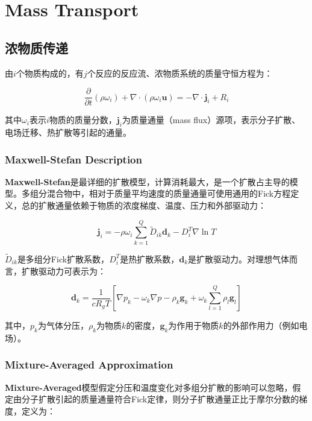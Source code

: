 \chapter{Mass Transport}

\section{浓物质传递}
由$i$个物质构成的，有$j$个反应的反应流、浓物质系统的质量守恒方程为：

\begin{equation}
    \frac{\partial}{\partial t}(\rho\omega_i) + \nabla\cdot(\rho\omega_i\bm{u}) = -\nabla\cdot\bm{j}_i + R_i
\end{equation}

其中$\omega_i$表示$i$物质的质量分数，$\bm{j}_i$为质量通量（mass flux）源项，表示分子扩散、电场迁移、热扩散等引起的通量。

\subsection{Maxwell-Stefan Description}
\textbf{Maxwell-Stefan}是最详细的扩散模型，计算消耗最大，是一个扩散占主导的模型。多组分混合物中，相对于质量平均速度的质量通量可使用通用的Fick方程定义，总的扩散通量依赖于物质的浓度梯度、温度、压力和外部驱动力：

\begin{equation}
    \bm{j}_i = -\rho\omega_i\sum_{k=1}^{Q} \tilde{D}_{ik} \bm{d}_{k} - D_i^T\nabla\ln T
\end{equation}

$\tilde{D}_{ik}$是多组分Fick扩散系数，$D_i^T$是热扩散系数，$\bm{d}_k$是扩散驱动力。对理想气体而言，扩散驱动力可表示为：

\begin{equation}
    \bm{d}_k = \frac{1}{cR_gT} \left[ \nabla p_k-\omega_k\nabla p - \rho_k \bm{g}_k +\omega_k \sum_{l=1}^{Q} \rho_l \bm{g}_l \right]
\end{equation}

其中，$p_k$为气体分压，$\rho_k$为物质$k$的密度，$\bm{g}_k$为作用于物质$k$的外部作用力（例如电场）。

\subsection{Mixture-Averaged Approximation}
\textbf{Mixture-Averaged}模型假定分压和温度变化对多组分扩散的影响可以忽略，假定由分子扩散引起的质量通量符合Fick定律，则分子扩散通量正比于摩尔分数的梯度，定义为：

